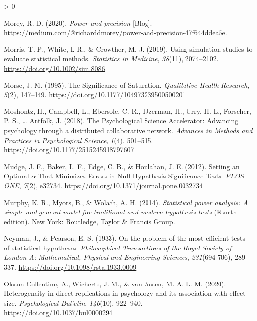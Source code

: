 \documentclass[
  english,
  ,jou, a4paper,floatsintext]{apa6}
\newlength{\cslhangindent}
\newenvironment{CSLReferences}[2] %
 {%
  \setlength{\parindent}{0pt}
  \ifodd #1 \everypar{\setlength{\hangindent}{\cslhangindent}}\ignorespaces\fi
  \ifnum #2 > 0
  \setlength{\parskip}{#2\baselineskip}
  \fi
 }%
 {}
\begin{document}
\begin{CSLReferences}{1}{0}
\leavevmode\hypertarget{ref-morey_power_2020}{}%
Morey, R. D. (2020). \emph{Power and precision} {[}Blog{]}. https://medium.com/@richarddmorey/power-and-precision-47f644ddea5e.

\leavevmode\hypertarget{ref-morris_using_2019}{}%
Morris, T. P., White, I. R., \& Crowther, M. J. (2019). Using simulation studies to evaluate statistical methods. \emph{Statistics in Medicine}, \emph{38}(11), 2074--2102. \url{https://doi.org/10.1002/sim.8086}

\leavevmode\hypertarget{ref-morse_significance_1995}{}%
Morse, J. M. (1995). The {Significance} of {Saturation}. \emph{Qualitative Health Research}, \emph{5}(2), 147--149. \url{https://doi.org/10.1177/104973239500500201}

\leavevmode\hypertarget{ref-moshontz_psychological_2018}{}%
Moshontz, H., Campbell, L., Ebersole, C. R., IJzerman, H., Urry, H. L., Forscher, P. S., \ldots{} Antfolk, J. (2018). The {Psychological Science Accelerator}: Advancing psychology through a distributed collaborative network. \emph{Advances in Methods and Practices in Psychological Science}, \emph{1}(4), 501--515. \url{https://doi.org/10.1177/2515245918797607}

\leavevmode\hypertarget{ref-mudge_setting_2012}{}%
Mudge, J. F., Baker, L. F., Edge, C. B., \& Houlahan, J. E. (2012). Setting an {Optimal} {\(\alpha\)} {That Minimizes Errors} in {Null Hypothesis Significance Tests}. \emph{PLOS ONE}, \emph{7}(2), e32734. \url{https://doi.org/10.1371/journal.pone.0032734}

\leavevmode\hypertarget{ref-murphy_statistical_2014}{}%
Murphy, K. R., Myors, B., \& Wolach, A. H. (2014). \emph{Statistical power analysis: A simple and general model for traditional and modern hypothesis tests} (Fourth edition). {New York}: {Routledge, Taylor \& Francis Group}.

\leavevmode\hypertarget{ref-neyman_problem_1933}{}%
Neyman, J., \& Pearson, E. S. (1933). On the problem of the most efficient tests of statistical hypotheses. \emph{Philosophical Transactions of the Royal Society of London A: Mathematical, Physical and Engineering Sciences}, \emph{231}(694-706), 289--337. \url{https://doi.org/10.1098/rsta.1933.0009}

\leavevmode\hypertarget{ref-olsson-collentine_heterogeneity_2020}{}%
Olsson-Collentine, A., Wicherts, J. M., \& van Assen, M. A. L. M. (2020). Heterogeneity in direct replications in psychology and its association with effect size. \emph{Psychological Bulletin}, \emph{146}(10), 922--940. \url{https://doi.org/10.1037/bul0000294}


\end{CSLReferences}
\end{document}
